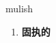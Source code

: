 
\begin{frame}
{\huge mulish}
\begin{center}
\begin{enumerate}\Large
  \item \textbf{固执的}
\end{enumerate}
\end{center}
\end{frame}
